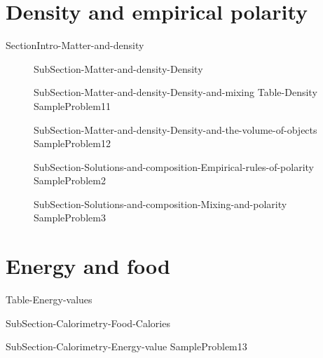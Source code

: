 \documentclass[main.tex]{subfiles}
\begin{document}
\section{\faTint Density and empirical polarity}
{SectionIntro-Matter-and-density}
\sloppy\begin{description}
\item[]{SubSection-Matter-and-density-Density}
\item[]{SubSection-Matter-and-density-Density-and-mixing}
{Table-Density} 
{SampleProblem11}
\item[]{SubSection-Matter-and-density-Density-and-the-volume-of-objects}
{SampleProblem12}

 
\item[] {SubSection-Solutions-and-composition-Empirical-rules-of-polarity}
{SampleProblem2}
\item[]{SubSection-Solutions-and-composition-Mixing-and-polarity}
 \hspace{2cm}{Table-Polarity-and-mixing}	
{SampleProblem3}
\end{description}


 


\section{\faFire Energy and food}
\sloppy\begin{description}
 {Table-Energy-values}
\item[\docfilehook{Calories in food }{ }]  {SubSection-Calorimetry-Food-Calories}
\item[\docfilehook{ Energy values}{ }]  {SubSection-Calorimetry-Energy-value}
 {SampleProblem13}
\end{description}
\end{document}
